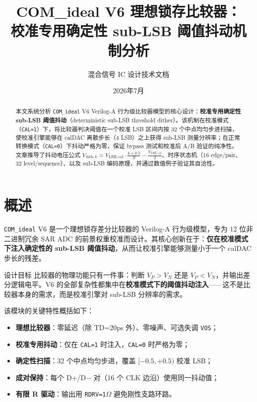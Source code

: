 \documentclass[UTF8,a4paper,11pt]{ctexart}
\title{\textbf{COM\_ideal V6 理想锁存比较器：\\[4pt]
校准专用确定性 sub-LSB 阈值抖动机制分析}}
\author{混合信号 IC 设计技术文档}
\date{2026年7月}
\newcommand{\Vlsb}{V_{\mathrm{LSB,cal}}}
\newcommand{\code}[1]{\texttt{#1}}
\begin{document}
\maketitle

\begin{abstract}
\noindent
本文系统分析 \code{COM\_ideal} V6 Verilog-A 行为级比较器模型的核心设计：\textbf{校准专用确定性 sub-LSB 阈值抖动}（deterministic sub-LSB threshold dither）。该机制在校准模式（\code{CAL=1}）下，将比较器判决阈值在一个校准 LSB 区间内按 32 个中点均匀步进扫描，使校准引擎能够在 calDAC 离散步长（4 LSB）之上获得 sub-LSB 测量分辨率；在正常转换模式（\code{CAL=0}）下抖动严格为零，保证 bypass 测试和校准后 A/B 验证的纯净性。文章推导了抖动电压公式 $V_{\mathrm{dith},k} = \Vlsb \cdot \frac{k+0.5}{N} - \frac{\Vlsb}{2}$、时序状态机（16 edge/pair、32 level/sequence）、以及 sub-LSB 编码原理，并通过数值例子验证其自洽性。
\end{abstract}

\bigskip

\tableofcontents
\newpage

\section{概述}

\code{COM\_ideal} V6 是一个理想锁存差分比较器的 Verilog-A 行为级模型，专为 12 位非二进制冗余 SAR ADC 的前景权重校准而设计。其核心创新在于：\textbf{仅在校准模式下注入确定性的 sub-LSB 阈值抖动}，从而让校准引擎能够测量小于一个 calDAC 步长的残差。

\begin{tipbox}{设计目标}
比较器的物理功能只有一件事：判断 $V_P > V_N$ 还是 $V_P < V_N$，并输出差分逻辑电平。V6 的全部复杂性都集中在\textbf{校准模式下的阈值抖动注入}——这不是比较器本身的需求，而是校准引擎对 sub-LSB 分辨率的需求。
\end{tipbox}

该模块的关键特性概括如下：

\begin{itemize}[leftmargin=2em]
    \item \textbf{理想比较器}：零延迟（除 TD=20ps 外）、零噪声、可选失调 \code{VOS}；
    \item \textbf{校准专用抖动}：仅在 \code{CAL=1} 时注入，\code{CAL=0} 时严格为零；
    \item \textbf{确定性扫描}：32 个中点均匀步进，覆盖 $[-0.5, +0.5)$ 校准 LSB；
    \item \textbf{成对保持}：每个 D+/D$-$ 对（16 个 CLK 边沿）使用同一抖动值；
    \item \textbf{有限 R 驱动}：输出用 \code{RDRV=1$\Omega$} 避免刚性支路环路。
\end{itemize}
\end{document}
